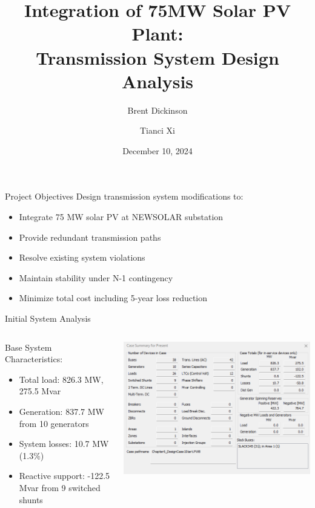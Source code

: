 \documentclass{beamer}
\title[75MW Solar Plant Integration]{Integration of 75MW Solar PV Plant:\\Transmission System Design Analysis}
\author{Brent Dickinson \and Tianci Xi}
\date{December 10, 2024}
\begin{document}
	
	\begin{frame}
		\titlepage
	\end{frame}
	
	\begin{frame}{Project Objectives}
		Design transmission system modifications to:
		\begin{itemize}
			\item Integrate 75 MW solar PV at NEWSOLAR substation
			\item Provide redundant transmission paths
			\item Resolve existing system violations
			\item Maintain stability under N-1 contingency
			\item Minimize total cost including 5-year loss reduction
		\end{itemize}
	\end{frame}
	
	\begin{frame}{Initial System Analysis}
		\begin{columns}[T]
			\begin{column}{0.4\textwidth}
				Base System Characteristics:
				\begin{itemize}
					\item Total load: 826.3 MW, 275.5 Mvar
					\item Generation: 837.7 MW from 10 generators
					\item System losses: 10.7 MW (1.3\%)
					\item Reactive support: -122.5 Mvar from 9 switched shunts
				\end{itemize}
			\end{column}
			\begin{column}{0.6\textwidth}
				\includegraphics[width=1\linewidth]{figures/case_summary_existing}
			\end{column}
		\end{columns}
	\end{frame}
	
\end{document}
